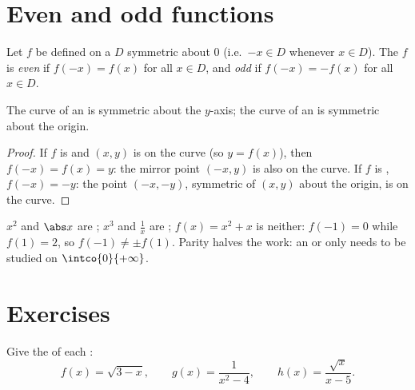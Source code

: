 \section{Even and odd functions}

\begin{definition}[Parity]\label{def:g11:func:parity}
Let $f$ be defined on a  $D$ symmetric about $0$ (i.e.\ $-x \in D$
whenever $x \in D$). The  $f$ is \emph{even}
if $f(-x) = f(x)$ for all $x \in D$, and \emph{odd} if
$f(-x) = -f(x)$ for all $x \in D$.
\end{definition}

\begin{proposition}\label{prop:g11:func:paritysym}
The curve of an  is symmetric about the $y$-axis; the curve
of an  is symmetric about the origin.
\end{proposition}

\begin{proof}
If $f$ is  and $(x, y)$ is on the curve (so $y = f(x)$), then
$f(-x) = f(x) = y$: the mirror point $(-x, y)$ is also on the curve. If
$f$ is , $f(-x) = -y$: the point $(-x, -y)$, symmetric of $(x,y)$ about
the origin, is on the curve.
\end{proof}

\begin{example}
$x^2$ and $\abs x$ are ; $x^3$ and $\frac1x$ are ;
$f(x) = x^2 + x$ is neither: $f(-1) = 0$ while $f(1) = 2$, so
$f(-1) \neq \pm f(1)$. Parity halves the work: an  or 
only needs to be studied on $\intco{0}{+\infty}$.
\end{example}

\section{Exercises}

\begin{exercise}[$\star$]\label{exo:g11:func:1}
Give the  of each :
\[
f(x) = \sqrt{3 - x}, \qquad
g(x) = \frac{1}{x^2 - 4}, \qquad
h(x) = \frac{\sqrt{x}}{x - 5} .
\]
\end{exercise}

